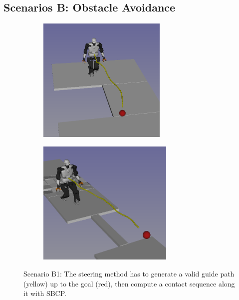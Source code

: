 \subsection{Scenarios B: Obstacle Avoidance}
\begin{figure}[t]
    \captionsetup[subfigure]{justification=centering}
    \centering
    \begin{subfigure}[t]{0.48\linewidth}
        \includegraphics[width=\textwidth, height=6cm]{Figures/Chapter_CPSB/hole_scenario.png}
    \end{subfigure}
    \begin{subfigure}[t]{0.48\linewidth}
        \includegraphics[width=\textwidth, height=6cm]{Figures/Chapter_CPSB/bridge_scenario.png}
    \end{subfigure}
    \caption{Scenario B1: The steering method has to generate a valid guide path (yellow) up to the goal (red), then compute a contact sequence along it with SBCP.}
    \label{fig:cp-sb:scenarios_hole_bridge}
\end{figure}

